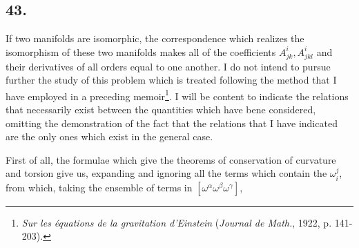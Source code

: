 \subsection*{43.}

If two manifolds are isomorphic, the correspondence which realizes the isomorphism of these two manifolds makes all of the coefficients $A_{jk}^i, A_{jkl}^i$ and their derivatives of all orders equal to one another. I do not intend to pursue further the study of this problem which is treated following the method that I have employed in a preceding memoir\footnote{\textit{Sur les équations de la gravitation d'Einstein} (\textit{Journal de Math.}, 1922, p. 141-203).}. I will be content to indicate the relations that necessarily exist between the quantities which have bene considered, omitting the demonstration of the fact that the relations that I have indicated are the only ones which exist in the general case.

First of all, the formulae which give the theorems of conservation of curvature and torsion
give us, expanding and ignoring all the terms which contain the $\omega_i^j$,
from which, taking the ensemble of terms in $[\omega^\alpha \omega^\beta \omega^\gamma]$,

